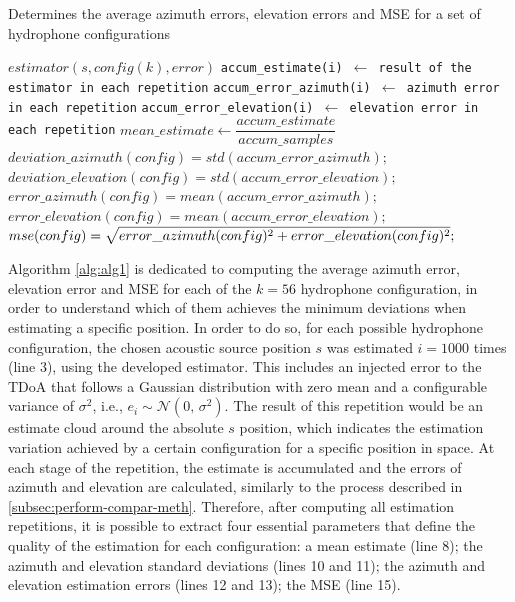 \begin{algorithm}
	\scriptsize		%
	\caption{Determines the average azimuth errors, elevation errors and MSE for a set of hydrophone configurations}
	\label{alg:alg1}
	\begin{algorithmic}[1]
		\STATE\texttt{$estimator(s, config(k), error)$}
		\STATE \texttt{accum\_estimate(i) $\gets$ result of the estimator in each repetition} 
		\STATE \texttt{accum\_error\_azimuth(i) $\gets$ azimuth error in each repetition} 
		\STATE \texttt{accum\_error\_elevation(i) $\gets$ elevation error in each repetition} 
		\ENDFOR
		\STATE $mean\_estimate \gets \dfrac{accum\_estimate}{accum\_samples}$
		\STATE
		\STATE $deviation\_azimuth(config) = std(accum\_error\_azimuth);$
		\STATE $deviation\_elevation(config) = std(accum\_error\_elevation);$
		\STATE $error\_azimuth(config) = mean(accum\_error\_azimuth);$
		\STATE $error\_elevation(config) = mean(accum\_error\_elevation);$
		\STATE
		\STATE $mse(config) = \sqrt{\rule{0pt}{8pt}error\_azimuth(config)^{2} + error\_elevation(config)^{2}};$
		\ENDFOR
	\end{algorithmic}
\end{algorithm}

Algorithm \ref{alg:alg1} is dedicated to computing the average azimuth error, elevation error and MSE for each of the $k = 56$ hydrophone configuration, in order to understand which of them achieves the minimum deviations when estimating a specific position. In order to do so, for each possible hydrophone configuration, the chosen acoustic source position $s$ was estimated $i = 1000$ times (line 3), using the developed estimator. This includes an injected error to the TDoA that follows a Gaussian distribution with zero mean and a configurable variance of $\sigma^{2}$, i.e., $e_i \sim \mathcal{N}(0,\,\sigma^{2})$. The result of this repetition would be an estimate cloud around the absolute $s$ position, which indicates the estimation variation achieved by a certain configuration for a specific position in space. At each stage of the repetition, the estimate is accumulated and the errors of azimuth and elevation are calculated, similarly to the process described in \ref{subsec:perform-compar-meth}. Therefore, after computing all estimation repetitions, it is possible to extract four essential parameters that define the quality of the estimation for each configuration: a mean estimate (line 8); the azimuth and elevation standard deviations (lines 10 and 11); the azimuth and elevation estimation errors (lines 12 and 13); the MSE (line 15).

